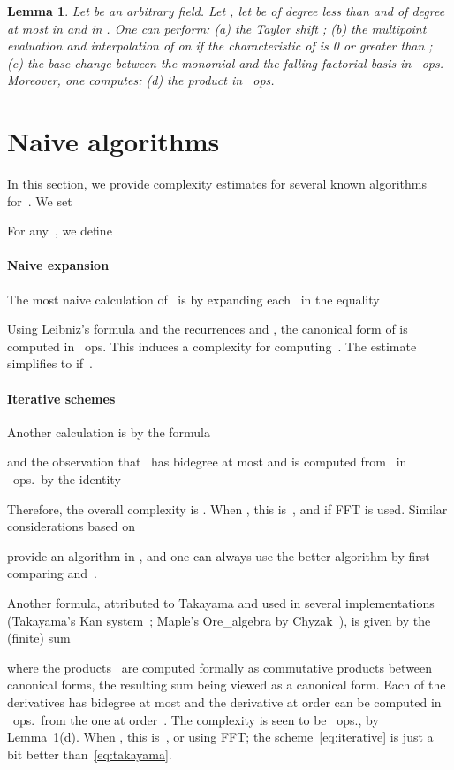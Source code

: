\documentclass{sig-alt-full}
\newtheorem{lemma}{Lemma}
\begin{document}
\begin{lemma}\label{cost-results}
Let\/  be an arbitrary field. Let , let  be of degree less than  and  of degree at most  in  and  in .
One can perform:
\emph{(a)\/} the Taylor shift ;
\emph{(b)\/} the multipoint evaluation and interpolation of  on  if the characteristic of\/  is 0 or greater than ;
\emph{(c)\/} the base change between the monomial and  the falling factorial basis 
in ~ops.
Moreover, one computes:
\emph{(d)\/} the product  in ~ops.
\end{lemma}


\section{Naive algorithms}
\label{sec:naive-algos}

In this section, we provide complexity estimates for several known algorithms for~.
We set

For any~, we define


\paragraph*{Naive expansion}

The most naive calculation of~ is by expanding each~ in the equality

 Using Leibniz's formula  and the recurrences  and , the canonical form of  is computed in ~ops. 
This induces a complexity  for computing~.
The estimate simplifies to  if~.

\paragraph*{Iterative schemes}
Another calculation is by the formula

and the observation that ~has bidegree at most  and is computed from~ in ~ops.\ by the identity

Therefore, the overall complexity is .
When , this is~, and  if FFT is used.
Similar considerations based on

provide an algorithm in , and one can always use the better algorithm by first comparing  and~.

Another formula, attributed to Takayama and used in several implementations (Takayama's \textsf{Kan} system~\cite{Kan}; Maple's \textsf{Ore\_algebra} by Chyzak~\cite{Ore_algebra}), is given by the (finite) sum

where the products~ are computed formally as commutative products between canonical forms, the resulting sum being viewed as a canonical form.
Each of the derivatives has bidegree at most  and the derivative at order  can be computed in ~ops.\ from the one at order~.
The complexity is seen to be ~ops., by Lemma~\ref{cost-results}(d).
When , this is~, or  using FFT;
the scheme~\eqref{eq:iterative} is just a bit better than~\eqref{eq:takayama}.
\end{document}
